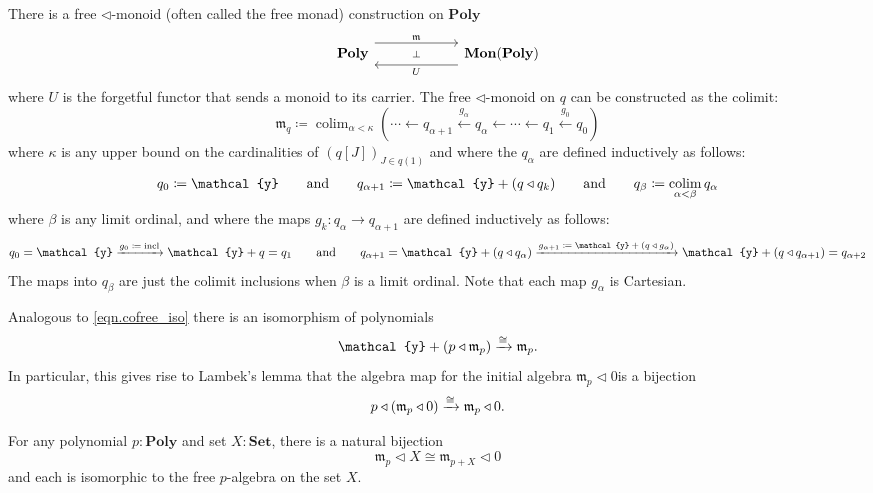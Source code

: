 \documentclass[11pt, one side, article]{memoir}
\theoremstyle{definition}
\theoremstyle{plain}
\DeclareMathOperator*{\colim}{colim}
\newcommand{\Cat}[1]{\mathbf{#1}}%
\newcommand{\To}[2][]{\xrightarrow[#1]{\tn{$#2$}}}
\newcommand{\from}{\leftarrow}
\newcommand{\From}[1]{\xleftarrow{#1}}
\newcommand{\tn}[1]{\textnormal{#1}}
\newcommand{\smset}{\Cat{Set}}
\newcommand{\yon}{{\mathcal{y}}}
\newcommand{\poly}{\Cat{Poly}}
\newcommand{\0}{\textsf{0}}
\newcommand{\1}{\tn{\textsf{1}}}
\newcommand{\tri}{\mathbin{\triangleleft}}
\newcommand{\free}{\mathfrak{m}}
\newcommand{\hh}[2][]{#1 \tn{#2} #1}
\newcommand{\qqand}{\hh[\qquad]{and}}
\begin{document}
There is a free $\tri$-monoid (often called the free monad) construction on $\poly$
\begin{equation}\label{eqn.free_monad}
\begin{tikzcd}[column sep=60pt]
	\poly
  	\ar[from=r, shift left=8pt, "U"]
		\ar[from=r, phantom, "\scriptstyle\bot"]
  	&
	\Cat{Mon}(\poly)
		\ar[from=l, shift right=-8pt, "\free"]
\end{tikzcd}
\end{equation}
where $U$ is the forgetful functor that sends a monoid to its carrier. 
The free $\tri$-monoid on $q$ can be constructed as the colimit:
\begin{equation}
	\free_q\coloneqq\colim_{\alpha<\kappa}(\cdots\from q_{\alpha+1}\From{g_\alpha}q_\alpha\from\cdots\from q_1\From{g_0} q_0)
\end{equation}
where $\kappa$ is any upper bound on the cardinalities of $(q[J])_{J\in q(1)}$ and where the $q_\alpha$ are defined inductively as follows:
\begin{equation}
	q_0\coloneqq \yon
	\qqand
	q_{\alpha+1}\coloneqq \yon+(q\tri q_k)
	\qqand
	q_\beta\coloneqq\colim_{\alpha<\beta}q_\alpha
\end{equation}
where $\beta$ is any limit ordinal, and where the maps $g_k\colon q_{\alpha}\to q_{\alpha+1}$ are defined inductively as follows:
\begin{equation}
	q_0=\yon
	\To{g_0\coloneqq\tn{incl}}\yon+q=q_1
	\qqand
	q_{\alpha+1}=\yon+(q\tri q_{\alpha})
	\To{g_{\alpha+1}\coloneqq\yon+(q\tri g_\alpha)}\yon+(q\tri q_{\alpha+1})=q_{\alpha+2}
\end{equation}
The maps into $q_\beta$ are just the colimit inclusions when $\beta$ is a limit ordinal. Note that each map $g_\alpha$ is Cartesian. 

Analogous to \cref{eqn.cofree_iso} there is an isomorphism of polynomials
\begin{equation}
	 \yon+(p\tri\free_p)\To{\cong}\free_p.
	\end{equation}
In particular, this gives rise to Lambek's lemma that the algebra map for the initial algebra $\free_p\tri 0$is a bijection
\begin{equation}
		p\tri(\free_p\tri 0)\To\cong\free_p\tri0.
\end{equation}

For any polynomial $p:\poly$ and set $X:\smset$, there is a natural bijection
\begin{equation}
  \free_p\tri X
  \cong
	\free_{p+X}\tri 0  
\end{equation}
and each is isomorphic to the free $p$-algebra on the set $X$.
\end{document}
